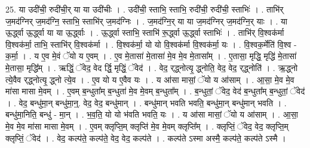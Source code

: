 \documentclass[17pt]{extarticle}
\begin{document}
25. या उदी॑ची॒ रुदी॑ची॒र् या या उदी॑चीः । . उदी॑ची॒ स्ताभि॒ स्ताभि॒ रुदी॑ची॒ रुदी॑ची॒ स्ताभिः॑ । . ताभि॑र् ज॒मद॑ग्निर् ज॒मद॑ग्नि॒ स्ताभि॒ स्ताभि॑र् ज॒मद॑ग्निः । . ज॒मद॑ग्नि॒र् या या ज॒मद॑ग्निर् ज॒मद॑ग्नि॒र् याः । . या ऊ॒र्द्ध्वा ऊ॒र्द्ध्वा या या ऊ॒र्द्ध्वाः । . ऊ॒र्द्ध्वा स्ताभि॒ स्ताभि॑ रू॒र्द्ध्वा ऊ॒र्द्ध्वा स्ताभिः॑ । . ताभि॑र् वि॒श्वक॑र्मा वि॒श्वक॑र्मा॒ ताभि॒ स्ताभि॑र् वि॒श्वक॑र्मा । . वि॒श्वक॑र्मा॒ यो यो वि॒श्वक॑र्मा वि॒श्वक॑र्मा॒ यः । . वि॒श्वक॒र्मेति॑ वि॒श्व - क॒र्मा॒ । . य ए॒व मे॒वं ॅयो य ए॒वम् । . ए॒व मे॒तासा॑ मे॒तासा॑ मे॒व मे॒व मे॒तासा᳚म् । . ए॒तासा॒ मृद्धि॒ मृद्धि॑ मे॒तासा॑ मे॒तासा॒ मृद्धि᳚म् । . ऋद्धिं॒ ॅवेद॒ वेद र्द्धि॒ मृद्धिं॒ ॅवेद॑ । . वेद॒ र्‌द्ध्नोत्यृ॒ द्ध्नोति॒ वेद॒ वेद॒ र्‌द्ध्नोति॑ । . ऋ॒द्ध्नो त्ये॒वैव र्‌द्ध्नोत्यृ॒ द्ध्नो त्ये॒व । . ए॒व यो य ए॒वैव यः । . य आ॑सा मासां॒ ॅयो य आ॑साम् । . आ॒सा॒ मे॒व मे॒व मा॑सा मासा मे॒वम् । . ए॒वम् ब॒न्धुता᳚म् ब॒न्धुता॑ मे॒व मे॒वम् ब॒न्धुता᳚म् । . ब॒न्धुतां॒ ॅवेद॒ वेद॑ ब॒न्धुता᳚म् ब॒न्धुतां॒ ॅवेद॑ । . वेद॒ बन्धु॑मा॒न् बन्धु॑मा॒न्॒. वेद॒ वेद॒ बन्धु॑मान् । . बन्धु॑मान् भवति भवति॒ बन्धु॑मा॒न् बन्धु॑मान् भवति । . बन्धु॑मा॒निति॒ बन्धु॑ - मा॒न् । . भ॒व॒ति॒ यो यो भ॑वति भवति॒ यः । . य आ॑सा मासां॒ ॅयो य आ॑साम् । . आ॒सा॒ मे॒व मे॒व मा॑सा मासा मे॒वम् । . ए॒वम् क्लृप्ति॒म् क्लृप्ति॑ मे॒व मे॒वम् क्लृप्ति᳚म् । . क्लृप्तिं॒ ॅवेद॒ वेद॒ क्लृप्ति॒म् क्लृप्तिं॒ ॅवेद॑ । . वेद॒ कल्प॑ते॒ कल्प॑ते॒ वेद॒ वेद॒ कल्प॑ते । . कल्प॑ते ऽस्मा अस्मै॒ कल्प॑ते॒ कल्प॑ते ऽस्मै । \newline
\end{document}
